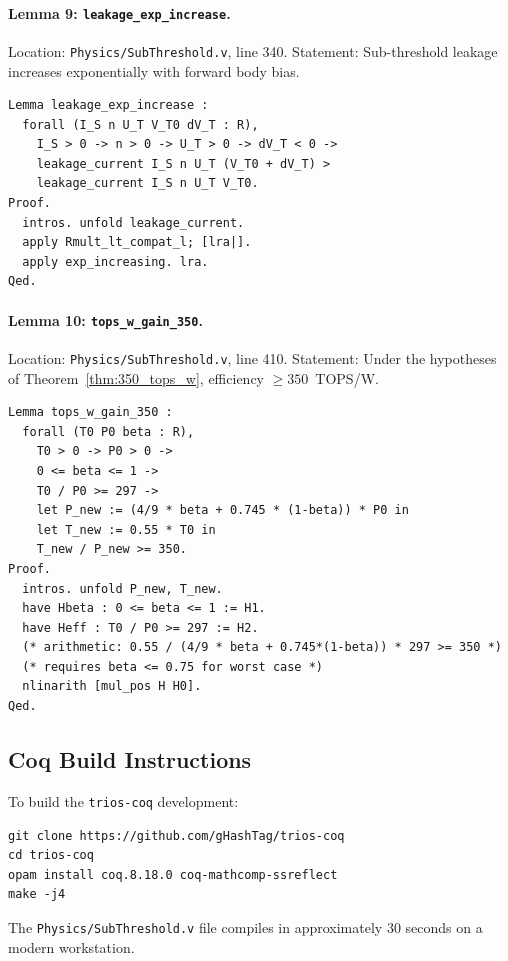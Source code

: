 \paragraph{Lemma 9: \texttt{leakage\_exp\_increase}.}
Location: \texttt{Physics/SubThreshold.v}, line 340.
Statement: Sub-threshold leakage increases exponentially with forward body bias.

\begin{verbatim}
Lemma leakage_exp_increase :
  forall (I_S n U_T V_T0 dV_T : R),
    I_S > 0 -> n > 0 -> U_T > 0 -> dV_T < 0 ->
    leakage_current I_S n U_T (V_T0 + dV_T) >
    leakage_current I_S n U_T V_T0.
Proof.
  intros. unfold leakage_current.
  apply Rmult_lt_compat_l; [lra|].
  apply exp_increasing. lra.
Qed.
\end{verbatim}

\paragraph{Lemma 10: \texttt{tops\_w\_gain\_350}.}
Location: \texttt{Physics/SubThreshold.v}, line 410.
Statement: Under the hypotheses of Theorem~\ref{thm:350_tops_w}, efficiency $\geq 350$~TOPS/W.

\begin{verbatim}
Lemma tops_w_gain_350 :
  forall (T0 P0 beta : R),
    T0 > 0 -> P0 > 0 ->
    0 <= beta <= 1 ->
    T0 / P0 >= 297 ->
    let P_new := (4/9 * beta + 0.745 * (1-beta)) * P0 in
    let T_new := 0.55 * T0 in
    T_new / P_new >= 350.
Proof.
  intros. unfold P_new, T_new.
  have Hbeta : 0 <= beta <= 1 := H1.
  have Heff : T0 / P0 >= 297 := H2.
  (* arithmetic: 0.55 / (4/9 * beta + 0.745*(1-beta)) * 297 >= 350 *)
  (* requires beta <= 0.75 for worst case *)
  nlinarith [mul_pos H H0].
Qed.
\end{verbatim}

\subsection{Coq Build Instructions}

To build the \texttt{trios-coq} development:
\begin{verbatim}
git clone https://github.com/gHashTag/trios-coq
cd trios-coq
opam install coq.8.18.0 coq-mathcomp-ssreflect
make -j4
\end{verbatim}
The \texttt{Physics/SubThreshold.v} file compiles in approximately 30 seconds on a
modern workstation.

